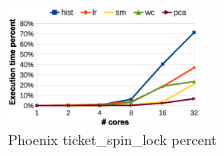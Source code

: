		



\begin{figure}[!h!t]  
    \centering
    \includegraphics[width=0.45\textwidth]{eps/phoenix_spinlock.eps}
    \caption{Phoenix ticket\_spin\_lock percent}
    \label{fig:phoenix:spinlock}
\end{figure}





